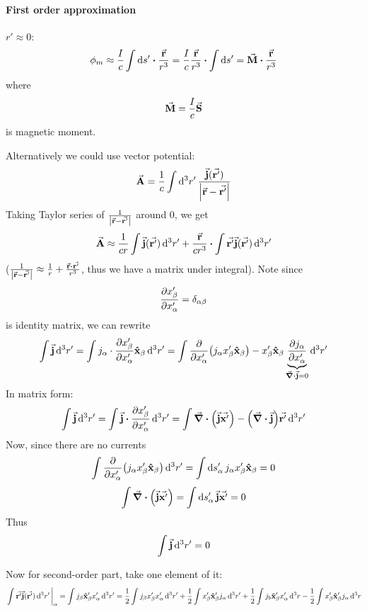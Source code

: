 \paragraph{First order approximation}
$r' \approx 0$:
$$\phi_m \approx \frac{I}{c} \int  \dd{s'} \vdot \frac{\va{r}}{r^3} = \frac{I}{c} \frac{\va{r}}{r^3}  \vdot  \int  \dd{s'} = \va{M} \vdot \frac{\va{r}}{r^3}$$
where
$$\va{M}= \frac{I}{c} \va{S}$$
is magnetic moment.

Alternatively we could use vector potential:
$$\va{A} = \frac{1}{c} \int \dd[3]{r'} \frac{\va{j}(\va{r'})}{\abs{\va{r}-\va{r'}}}$$
Taking Taylor series of $\frac{1}{\abs{\va{r}-\va{r'}}}$ around 0, we get
$$\va{A} \approx \frac{1}{cr} \int \va{j}(\va{r'}) \dd[3]{r'} +  \frac{\va{r}}{cr^3} \vdot \int \va{r'} \va{j}(\va{r'}) \dd[3]{r'}$$
($\frac{1}{\abs{\va{r}-\va{r'}}} \approx \frac{1}{r} + \frac{\va{r}\vdot \va{r'}}{r^3}$, thus we have a matrix under integral).
Note since
$$\pdv{x'_\beta}{x'_\alpha} = \delta_{\alpha\beta}$$
is identity matrix, we can rewrite
$$\int \va{j} \dd[3]{r'} =\int j_\alpha \cdot \pdv{x'_\beta}{x'_\alpha} \vu{x}_\beta \dd[3]{r'} = \int \pdv{x'_\alpha}\qty(j_\alpha x'_\beta \vu{x}_\beta) - x'_\beta \vu{x}_\beta\underbrace{ \pdv{j_\alpha}{x'_\alpha}}_{\div{\va{j}} = 0}\dd[3]{r'}$$
In matrix form:
$$\int \va{j} \dd[3]{r'} =\int \va{j} \vdot \pdv{x'_\beta}{x'_\alpha} \dd[3]{r'} = \int \div(\va{j}\va{x'})  - \qty(\div{\va{j}} )\va{r'} \dd[3]{r'}$$
Now, since there are no currents
$$\int \pdv{x'_\alpha}\qty(j_\alpha x'_\beta \vu{x}_\beta) \dd[3]{r'} = \int \dd{s'_\alpha} j_\alpha x'_\beta \vu{x}_\beta = 0$$
$$ \int \div(\va{j}\va{x'})  =  \int \dd{s'_\alpha} \va{j}\va{x'}  = 0$$
Thus
$$\int \va{j} \dd[3]{r'} =0$$


Now for second-order part, take one element of it:
$$ \eval{\int \va{r'} \va{j}(\va{r'}) \dd[3]{r'}}_{\alpha} = \int j_\beta \vu{x}'_\beta x'_\alpha \dd[3]{r'} = \frac{1}{2} \int j_\beta x'_\beta  x'_\alpha \dd[3]{r'} + \frac{1}{2} \int x'_\beta \vu{x}'_\beta j_\alpha \dd[3]{r'} + \frac{1}{2} \int j_b \vu{x}'_\beta x'_\alpha \dd[3]{r} - \frac{1}{2} \int x'_\beta \vu{x}'_\beta j_\alpha \dd[3]{r} $$